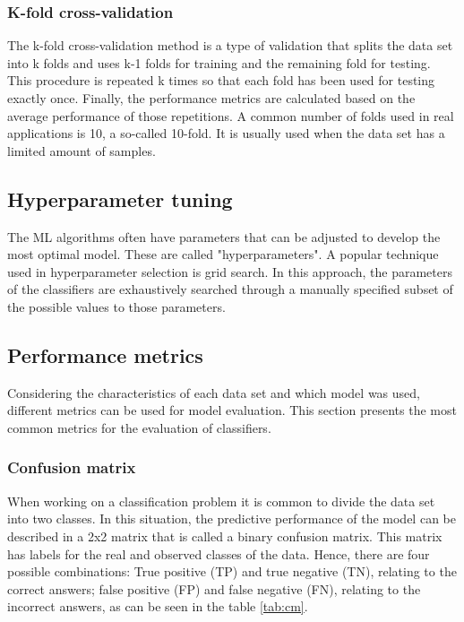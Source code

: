 \subsubsection{K-fold cross-validation}

The k-fold cross-validation method is a type of validation that splits the data set into k folds and uses k-1 folds for training and the remaining fold for testing. This procedure is repeated k times so that each fold has been used for testing exactly once. Finally, the performance metrics are calculated based on the average performance of those repetitions. A common number of folds used in real applications is 10, a so-called 10-fold. It is usually used when the data set has a limited amount of samples.

\subsection{Hyperparameter tuning}
\label{sc:ht}

The ML algorithms often have parameters that can be adjusted to develop the most optimal model. These are called "hyperparameters". A popular technique used in hyperparameter selection is grid search. In this approach, the parameters of the classifiers are exhaustively searched through a manually specified subset of the possible values to those parameters.

\subsection{Performance metrics}
\label{sc:pm}

Considering the characteristics of each data set and which model was used, different metrics can be used for model evaluation. This section presents the most common metrics for the evaluation of classifiers.

\subsubsection{Confusion matrix}
When working on a classification problem it is common to divide the data set into two classes. In this situation, the predictive performance of the model can be described in a 2x2 matrix that is called a binary confusion matrix. This matrix has labels for the real and observed classes of the data. Hence, there are four possible combinations: True positive (TP) and true negative (TN), relating to the correct answers; false positive (FP) and false negative (FN), relating to the incorrect answers, as can be seen in the table \ref{tab:cm}.


